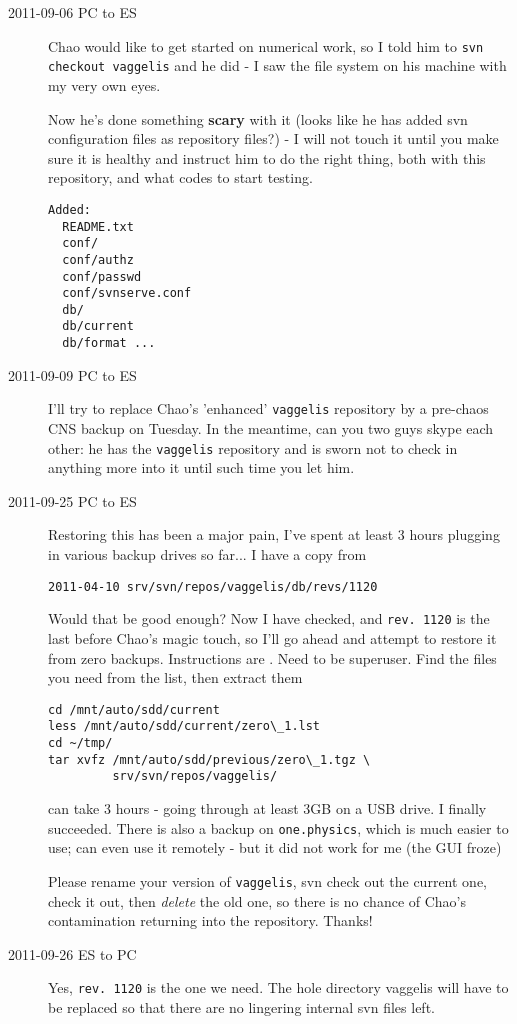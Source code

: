 \begin{description}
\item[2011-09-06 PC to ES]
Chao would like to get started on numerical work, so I told him to
    \texttt{svn checkout vaggelis}
and he did - I saw the file system on his machine with my very own eyes.

Now he's done something \textbf{scary} with it (looks like he has added svn configuration
files as repository files?) - I will not touch it until you make sure it is healthy and
instruct him to do the right thing, both with this repository, and what codes to start
testing.

\begin{verbatim}
Added:
  README.txt
  conf/
  conf/authz
  conf/passwd
  conf/svnserve.conf
  db/
  db/current
  db/format ...
\end{verbatim}

\item[2011-09-09 PC to ES]
I'll try to replace Chao's 'enhanced' \texttt{vaggelis} repository by a
pre-chaos CNS backup on Tuesday. In the meantime, can you two guys skype
each other: he has the \texttt{vaggelis} repository and is sworn not to
check in anything more into it until such time you let him.

\item[2011-09-25 PC to ES]
Restoring this has been a major pain, I've spent at least 3 hours
plugging in various backup drives so far... I have a copy from
\begin{verbatim}
2011-04-10 srv/svn/repos/vaggelis/db/revs/1120
\end{verbatim}
Would that be good enough?
Now I have checked, and \texttt{rev. 1120} is the last before Chao's
magic touch,
so I'll go ahead and attempt to restore it from zero backups. Instructions
are .
Need to be superuser.
Find the files you need from the list, then extract them
\begin{verbatim}
cd /mnt/auto/sdd/current
less /mnt/auto/sdd/current/zero\_1.lst
cd ~/tmp/
tar xvfz /mnt/auto/sdd/previous/zero\_1.tgz \
         srv/svn/repos/vaggelis/
\end{verbatim}
can take 3 hours - going through at least 3GB on a USB drive.
I finally succeeded. There is also a backup on \texttt{one.physics},
which is much easier to use; can even use
it remotely - but it did not work for me (the GUI froze)

Please rename your version of \texttt{vaggelis}, svn check out the
current one, check it out, then {\em delete} the old one,
so there is no chance of Chao's contamination returning into the repository.
Thanks!

\item[2011-09-26 ES to PC]

Yes, \texttt{rev. 1120} is the one we need. The hole directory vaggelis will have
to be replaced so that there are no lingering internal svn files left.

\end{description}

